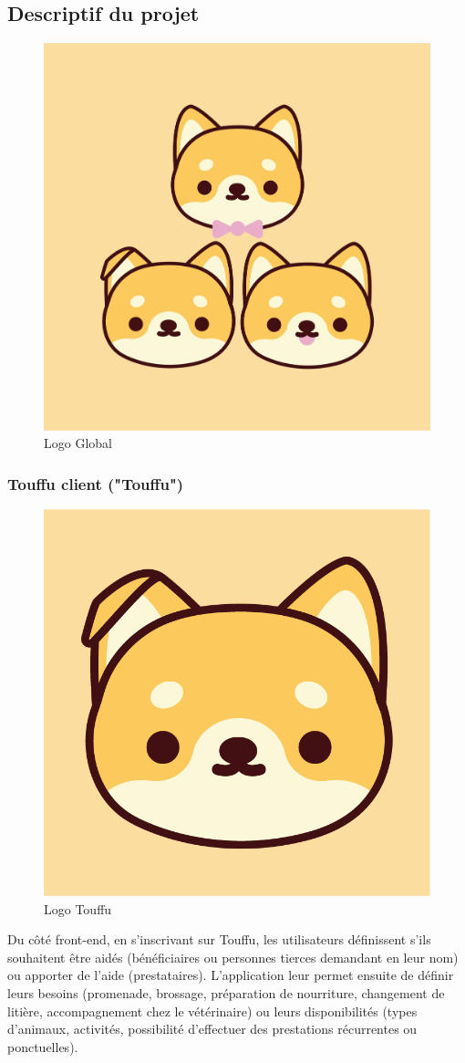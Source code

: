 \documentclass[conference]{IEEEtran}
\begin{document}
\subsection{Descriptif du projet}

\begin{figure}[h]
	\centering
	\includegraphics[width=0.4\columnwidth]{Ressources/Icons/v1_all.png}
	\caption{Logo Global}
	\label{fig:logotouffuall}
\end{figure}

\subsubsection{Touffu client ("Touffu")}\hfil

\begin{figure}[h]
	\centering
	\includegraphics[width=0.4\columnwidth]{Ressources/Icons/v1_2@3x.png}
	\caption{Logo Touffu}
	\label{fig:logotouffu}
\end{figure}

Du côté front-end, en s'inscrivant sur Touffu, les utilisateurs définissent s'ils souhaitent être aidés (bénéficiaires ou personnes tierces demandant en leur nom) ou apporter de l'aide (prestataires). L'application leur permet ensuite de définir leurs besoins (promenade, brossage, préparation de nourriture, changement de litière, accompagnement chez le vétérinaire) ou leurs disponibilités (types d'animaux, activités, possibilité d'effectuer des prestations récurrentes ou ponctuelles).\\
\end{document}
